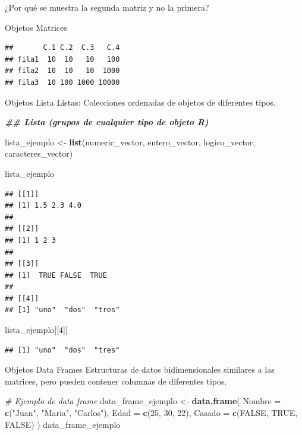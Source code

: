\documentclass[
  ignorenonframetext,
]{beamer}
\newenvironment{Shaded}{\begin{snugshade}}{\end{snugshade}}
\newcommand{\AttributeTok}[1]{\textcolor[rgb]{0.13,0.29,0.53}{#1}}
\newcommand{\CommentTok}[1]{\textcolor[rgb]{0.56,0.35,0.01}{\textit{#1}}}
\newcommand{\ConstantTok}[1]{\textcolor[rgb]{0.56,0.35,0.01}{#1}}
\newcommand{\DecValTok}[1]{\textcolor[rgb]{0.00,0.00,0.81}{#1}}
\newcommand{\DocumentationTok}[1]{\textcolor[rgb]{0.56,0.35,0.01}{\textbf{\textit{#1}}}}
\newcommand{\FunctionTok}[1]{\textcolor[rgb]{0.13,0.29,0.53}{\textbf{#1}}}
\newcommand{\NormalTok}[1]{#1}
\newcommand{\OtherTok}[1]{\textcolor[rgb]{0.56,0.35,0.01}{#1}}
\newcommand{\StringTok}[1]{\textcolor[rgb]{0.31,0.60,0.02}{#1}}
\begin{document}
\begin{frame}[fragile]{¿Por qué se muestra la segunda matriz y no la
primera?}
\begin{block}{Objetos \textbar{} Matrices}
\begin{verbatim}
##       C.1 C.2  C.3   C.4
## fila1  10  10   10   100
## fila2  10  10   10  1000
## fila3  10 100 1000 10000
\end{verbatim}
\end{block}

\begin{block}{Objetos \textbar{} Lista}
\protect\hypertarget{objetos-lista}{}
Listas: Colecciones ordenadas de objetos de diferentes tipos.

\begin{Shaded}
\begin{Highlighting}[]
\DocumentationTok{\#\# Lista (grupos de cualquier tipo de objeto R)}

\NormalTok{lista\_ejemplo }\OtherTok{\textless{}{-}} \FunctionTok{list}\NormalTok{(numeric\_vector, entero\_vector, logico\_vector, caracteres\_vector)}


\NormalTok{lista\_ejemplo}
\end{Highlighting}
\end{Shaded}

\begin{verbatim}
## [[1]]
## [1] 1.5 2.3 4.0
## 
## [[2]]
## [1] 1 2 3
## 
## [[3]]
## [1]  TRUE FALSE  TRUE
## 
## [[4]]
## [1] "uno"  "dos"  "tres"
\end{verbatim}

\begin{Shaded}
\begin{Highlighting}[]
\NormalTok{lista\_ejemplo[[}\DecValTok{4}\NormalTok{]]}
\end{Highlighting}
\end{Shaded}

\begin{verbatim}
## [1] "uno"  "dos"  "tres"
\end{verbatim}
\end{block}

\begin{block}{Objetos \textbar{} Data Frames}
\protect\hypertarget{objetos-data-frames}{}
Estructuras de datos bidimensionales similares a las matrices, pero
pueden contener columnas de diferentes tipos.

\begin{Shaded}
\begin{Highlighting}[]
\CommentTok{\# Ejemplo de data frame}
\NormalTok{data\_frame\_ejemplo }\OtherTok{\textless{}{-}} \FunctionTok{data.frame}\NormalTok{(}
  \AttributeTok{Nombre =} \FunctionTok{c}\NormalTok{(}\StringTok{"Juan"}\NormalTok{, }\StringTok{"Maria"}\NormalTok{, }\StringTok{"Carlos"}\NormalTok{),}
  \AttributeTok{Edad =} \FunctionTok{c}\NormalTok{(}\DecValTok{25}\NormalTok{, }\DecValTok{30}\NormalTok{, }\DecValTok{22}\NormalTok{),}
  \AttributeTok{Casado =} \FunctionTok{c}\NormalTok{(}\ConstantTok{FALSE}\NormalTok{, }\ConstantTok{TRUE}\NormalTok{, }\ConstantTok{FALSE}\NormalTok{)}
\NormalTok{)}
\NormalTok{data\_frame\_ejemplo}
\end{Highlighting}
\end{Shaded}


\end{block}
\end{frame}
\end{document}
